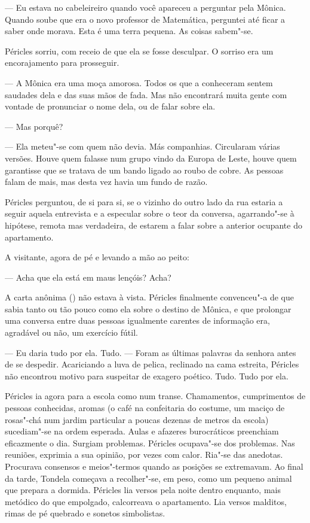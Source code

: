 --- Eu estava no cabeleireiro quando você apareceu a perguntar pela
  Mônica. Quando soube que era o novo professor de Matemática, perguntei
  até ficar a saber onde morava. Esta é uma terra pequena. As coisas
  sabem"-se.


Péricles sorriu, com receio de que ela se fosse desculpar. O sorriso era
um encorajamento para prosseguir.

--- A Mônica era uma moça amorosa. Todos os que a conheceram sentem
  saudades dela e das suas mãos de
fada. Mas não encontrará muita gente com vontade de pronunciar o nome
dela, ou de falar sobre ela.

--- Mas porquê?

--- Ela meteu"-se com quem não devia. Más companhias. Circularam várias
  versões. Houve quem falasse num grupo vindo da Europa de Leste, houve
  quem garantisse que se tratava de um bando ligado ao roubo de cobre.
  As pessoas falam de mais, mas desta vez havia um fundo de razão.


Péricles perguntou, de si para si, se o vizinho do outro lado da rua
estaria a seguir aquela entrevista e a especular sobre o teor da
conversa, agarrando"-se à hipótese, remota mas verdadeira, de estarem a
falar sobre a anterior ocupante do apartamento.

A visitante, agora de pé e levando a mão ao peito:

--- Acha que ela está em maus lençóis? Acha?


A carta anônima () não estava à vista. Péricles finalmente convenceu"-a de
que sabia tanto ou tão pouco como ela sobre o destino de Mônica, e que
prolongar uma conversa entre duas pessoas igualmente carentes de
informação era, agradável ou não, um exercício fútil.

--- Eu daria tudo por ela. Tudo. --- Foram as últimas palavras da
  senhora antes de se despedir. Acariciando a luva de pelica, reclinado
  na cama estreita, Péricles não encontrou motivo para suspeitar de
  exagero poético. Tudo. Tudo por ela.


Péricles ia agora para a escola como num transe. Chamamentos,
cumprimentos de pessoas conhecidas, aromas (o café na confeitaria do
costume, um maciço de rosas"-chá num jardim particular a poucas dezenas
de metros da escola) sucediam"-se na ordem esperada. Aulas e afazeres
burocráticos preenchiam eficazmente o dia. Surgiam problemas. Péricles ocupava"-se dos
problemas. Nas reuniões, exprimia a sua opinião, por vezes com calor.
Ria"-se das anedotas. Procurava consensos e meios"-termos quando as
posições se extremavam. Ao final da tarde, Tondela começava a
recolher"-se, em peso, como um pequeno animal que prepara a dormida.
Péricles lia versos pela noite dentro enquanto, mais metódico do que
empolgado, calcorreava o apartamento. Lia versos malditos, rimas de pé
quebrado e sonetos simbolistas.

